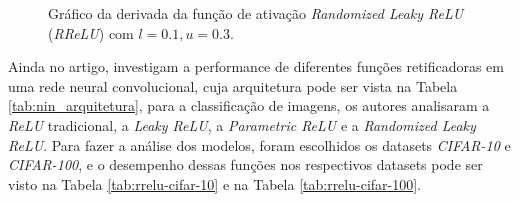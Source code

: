 \begin{figure}[h!]
    \centering
    \caption{Gráfico da derivada da função de ativação \textit{Randomized Leaky ReLU} (\textit{RReLU}) com $l=0.1, u=0.3$.}
    \label{fig:rrelu-derivada}
\end{figure}

Ainda no artigo, \textcite{XuRReLU} investigam a performance de diferentes funções retificadoras em uma rede neural convolucional, cuja arquitetura pode ser vista na Tabela \ref{tab:nin_arquitetura}, para a classificação de imagens, os autores analisaram a \textit{ReLU} tradicional, a \textit{Leaky ReLU}, a \textit{Parametric ReLU} e a \textit{Randomized Leaky ReLU}. Para fazer a análise dos modelos, foram escolhidos os datasets \textit{CIFAR-10} e \textit{CIFAR-100}, e o desempenho dessas funções nos respectivos datasets pode ser visto na Tabela \ref{tab:rrelu-cifar-10} e na Tabela \ref{tab:rrelu-cifar-100}.

